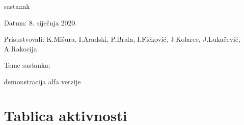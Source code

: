\begin{packed_enum}
			\item  sastanak
			\item[] \begin{packed_item}
				\item Datum: 8. siječnja 2020.
				\item Prisustvovali:  K.Mišura, I.Aradski, P.Brala, I.Fićković, J.Kolarec, J.Lukačević, A.Rakocija
				\item Teme sastanka:
				\begin{packed_item}
					\item  demonstracija alfa verzije 
				\end{packed_item}
			\end{packed_item}
			
		\end{packed_enum}
		
		\eject
		\section*{Tablica aktivnosti}
		
			
					
						
			
